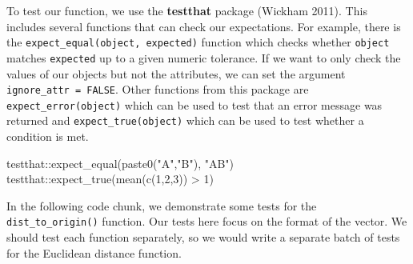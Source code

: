 \documentclass[
  letterpaper,
]{latex/krantz}
\makeatletter
\newenvironment{Shaded}{\begin{snugshade}}{\end{snugshade}}
\newcommand{\DecValTok}[1]{\textcolor[rgb]{0.68,0.00,0.00}{#1}}
\newcommand{\FunctionTok}[1]{\textcolor[rgb]{0.28,0.35,0.67}{#1}}
\newcommand{\NormalTok}[1]{\textcolor[rgb]{0.00,0.23,0.31}{#1}}
\newcommand{\SpecialCharTok}[1]{\textcolor[rgb]{0.37,0.37,0.37}{#1}}
\newcommand{\StringTok}[1]{\textcolor[rgb]{0.13,0.47,0.30}{#1}}
\newenvironment{kframe}{%
\medskip{}
\setlength{\fboxsep}{.8em}
 \def\at@end@of@kframe{}%
 \ifinner\ifhmode%
  \def\at@end@of@kframe{\end{minipage}}%
  \begin{minipage}{\columnwidth}%
 \fi\fi%
 \def\FrameCommand##1{\hskip\@totalleftmargin \hskip-\fboxsep
 \colorbox{shadecolor}{##1}\hskip-\fboxsep
     \hskip-\linewidth \hskip-\@totalleftmargin \hskip\columnwidth}%
 \MakeFramed {\advance\hsize-\width
   \@totalleftmargin\z@ \linewidth\hsize
   \@setminipage}}%
 {\par\unskip\endMakeFramed%
 \at@end@of@kframe}
\renewenvironment{Shaded}{\begin{kframe}}{\end{kframe}}
\makeatother
\begin{document}
To test our function, we use the
\textbf{testthat} package (Wickham 2011).
This includes several functions that can check our expectations. For
example, there is the \texttt{expect\_equal(object,\ expected)}
function which checks whether \texttt{object} matches \texttt{expected}
up to a given numeric tolerance. If we want to only check the values of
our objects but not the attributes, we can set the argument
\texttt{ignore\_attr\ =\ FALSE}. Other functions from this package are
\texttt{expect\_error(object)}
which can be used to test that an error message was returned and
\texttt{expect\_true(object)}
which can be used to test whether a condition is met.

\begin{Shaded}
\begin{Highlighting}[]
\NormalTok{testthat}\SpecialCharTok{::}\FunctionTok{expect\_equal}\NormalTok{(}\FunctionTok{paste0}\NormalTok{(}\StringTok{"A"}\NormalTok{,}\StringTok{"B"}\NormalTok{), }\StringTok{"AB"}\NormalTok{)}
\NormalTok{testthat}\SpecialCharTok{::}\FunctionTok{expect\_true}\NormalTok{(}\FunctionTok{mean}\NormalTok{(}\FunctionTok{c}\NormalTok{(}\DecValTok{1}\NormalTok{,}\DecValTok{2}\NormalTok{,}\DecValTok{3}\NormalTok{)) }\SpecialCharTok{\textgreater{}} \DecValTok{1}\NormalTok{)}
\end{Highlighting}
\end{Shaded}

In the following code chunk, we demonstrate some tests for the
\texttt{dist\_to\_origin()} function. Our tests here focus on the format
of the vector. We should test each function separately, so we would
write a separate batch of tests for the Euclidean distance function.
\end{document}
